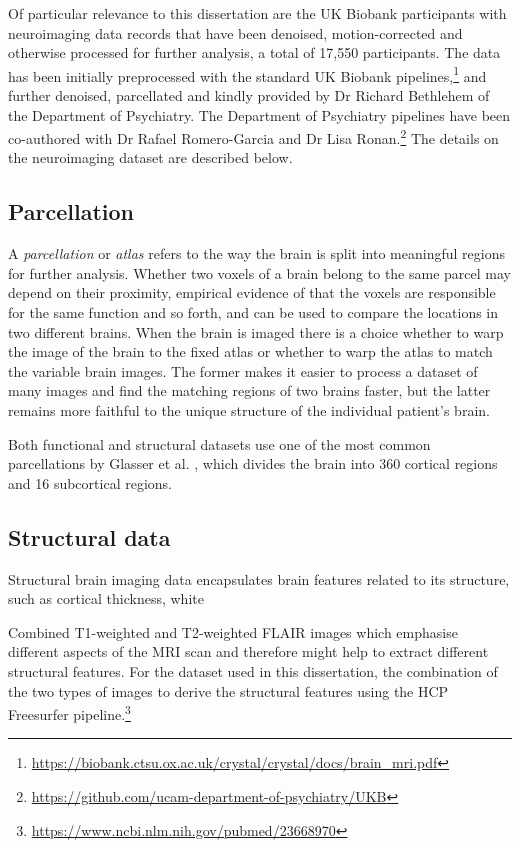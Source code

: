 Of particular relevance to this dissertation are the UK Biobank participants with neuroimaging data records that have been denoised, motion-corrected and otherwise processed for further analysis, a total of 17,550 participants. The data has been initially preprocessed with the standard UK Biobank pipelines,\footnote{\url{https://biobank.ctsu.ox.ac.uk/crystal/crystal/docs/brain_mri.pdf}} and further denoised, parcellated and kindly provided by Dr Richard Bethlehem of the Department of Psychiatry. The Department of Psychiatry pipelines have been co-authored with Dr Rafael Romero-Garcia and Dr Lisa Ronan.\footnote{\url{https://github.com/ucam-department-of-psychiatry/UKB}} The details on the neuroimaging dataset are described below.

\subsection{Parcellation}
A \textit{parcellation} or \textit{atlas} refers to the way the brain is split into meaningful regions for further analysis. Whether two voxels of a brain belong to the same parcel may depend on their proximity, empirical evidence of that the voxels are responsible for the same function and so forth, and can be used to compare the locations in two different brains. When the brain is imaged there is a choice whether to warp the image of the brain to the fixed atlas or whether to warp the atlas to match the variable brain images. The former makes it easier to process a dataset of many images and find the matching regions of two brains faster, but the latter remains more faithful to the unique structure of the individual patient's brain. 

Both functional and structural datasets use one of the most common parcellations by Glasser et al. \cite{glasser2016multi}, which divides the brain into 360 cortical regions and 16 subcortical regions. 

\subsection{Structural data}
Structural brain imaging data encapsulates brain features related to its structure, such as cortical thickness, white 

Combined T1-weighted and T2-weighted FLAIR images which emphasise different aspects of the MRI scan and therefore might help to extract different structural features. For the dataset used in this dissertation, the combination of the two types of images to derive the structural features using the HCP Freesurfer pipeline.\footnote{\url{https://www.ncbi.nlm.nih.gov/pubmed/23668970}} 

